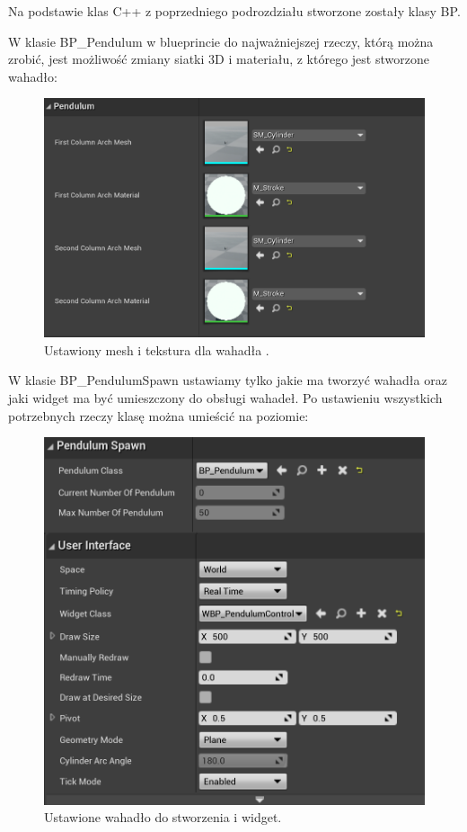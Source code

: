 \documentclass[a4paper,12pt,reqno]{article}
\begin{document}
Na podstawie klas C++ z poprzedniego podrozdziału stworzone zostały klasy BP.


W klasie BP\_Pendulum w blueprincie do najważniejszej rzeczy, którą można zrobić, jest możliwość zmiany siatki 3D i materiału, z którego jest stworzone wahadło:

\begin{figure}[!ht]%
\centering
\includegraphics[width=0.7\columnwidth]{graphics/pendulum/PendulumBP.png}
\caption{Ustawiony mesh i tekstura dla wahadła .
\label{BPExample}}%
%
\qquad
\end{figure}  

W klasie BP\_PendulumSpawn ustawiamy tylko jakie ma tworzyć wahadła oraz jaki widget ma być umieszczony do obsługi wahadeł. Po ustawieniu wszystkich potrzebnych rzeczy klasę można umieścić na poziomie:

\begin{figure}[!ht]%
\centering
\includegraphics[width=0.7\columnwidth]{graphics/pendulum/PendulumSpawnerBP.png}
\caption{Ustawione wahadło do stworzenia i widget.
\label{BPExample}}%
%
\qquad
\end{figure}  
\end{document}
